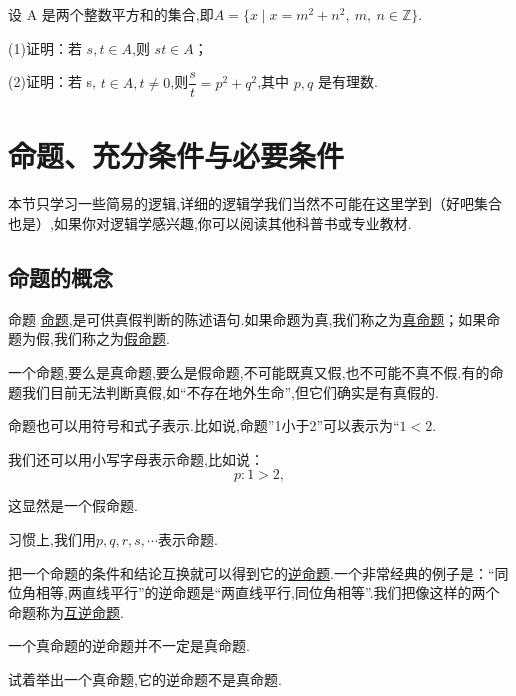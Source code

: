 \documentclass[lang=cn,math=cm,chinesefont=nofont,11pt,scheme=chinese,twocol]{elegantbook}
\begin{document}
\begin{exercise}\label{exer:18}
  设 A 是两个整数平方和的集合,即$A=\{x\mid x=m^2+n^2,\:m,\:n\in\mathbb{Z}\}.$

(1)证明：若 $s,t{\in}A$,则 $st{\in}A$；

(2)证明：若 s, $t\in A,t\neq0$,则$\dfrac st=p^2+q^2$,其中 $p,q$ 是有理数.
\end{exercise}

\section{命题、充分条件与必要条件}
本节只学习一些简易的逻辑,详细的逻辑学我们当然不可能在这里学到（好吧集合也是）,如果你对逻辑学感兴趣,你可以阅读其他科普书或专业教材.

\subsection{命题的概念}

\begin{definition}{命题}
  \underline{命题},是可供真假判断的陈述语句.如果命题为真,我们称之为\underline{真命题}；如果命题为假,我们称之为\underline{假命题}.
\end{definition}

\begin{remark}
  一个命题,要么是真命题,要么是假命题,不可能既真又假,也不可能不真不假.有的命题我们目前无法判断真假,如“不存在地外生命”,但它们确实是有真假的.
\end{remark}

命题也可以用符号和式子表示.比如说,命题”1小于2”可以表示为“$1<2$.

我们还可以用小写字母表示命题,比如说：$$p:1>2,$$

这显然是一个假命题.

习惯上,我们用$p,q,r,s,\cdots$表示命题.

\hspace*{\fill}

把一个命题的条件和结论互换就可以得到它的\underline{逆命题}.一个非常经典的例子是：“同位角相等,两直线平行”的逆命题是“两直线平行,同位角相等”.我们把像这样的两个命题称为\underline{互逆命题}.

\begin{remark}
  一个真命题的逆命题并不一定是真命题.
\end{remark}

\begin{exercise}\label{exer:202405021028}
  试着举出一个真命题,它的逆命题不是真命题.
\end{exercise}
\end{document}
